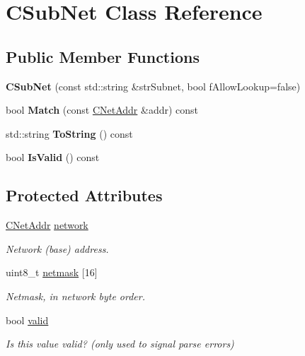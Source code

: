\hypertarget{class_c_sub_net}{}\section{C\+Sub\+Net Class Reference}
\label{class_c_sub_net}
\subsection*{Public Member Functions}
\begin{DoxyCompactItemize}
\item 
\mbox{\label{class_c_sub_net_a6e8cd7a5e46e93d3ad62896dcb5a5a78}} 
{\bfseries C\+Sub\+Net} (const std\+::string \&str\+Subnet, bool f\+Allow\+Lookup=false)
\item 
\mbox{\label{class_c_sub_net_af84fa02ebca222739c55e9d2cd7d38a3}} 
bool {\bfseries Match} (const \mbox{\hyperlink{class_c_net_addr}{C\+Net\+Addr}} \&addr) const
\item 
\mbox{\label{class_c_sub_net_a91cabfec6c5056fe8f8b477334563880}} 
std\+::string {\bfseries To\+String} () const
\item 
\mbox{\label{class_c_sub_net_abe05f70043af710ac075a4dd77757394}} 
bool {\bfseries Is\+Valid} () const
\end{DoxyCompactItemize}
\subsection*{Protected Attributes}
\begin{DoxyCompactItemize}
\item 
\mbox{\label{class_c_sub_net_a17c8e899bfed76a371c833fb4cd679c9}} 
\mbox{\hyperlink{class_c_net_addr}{C\+Net\+Addr}} \mbox{\hyperlink{class_c_sub_net_a17c8e899bfed76a371c833fb4cd679c9}{network}}
\begin{DoxyCompactList}\small\item\em Network (base) address. \end{DoxyCompactList}\item 
\mbox{\label{class_c_sub_net_a7ba6fc57a4ddcddfa3f3355cc3e56adc}} 
uint8\+\_\+t \mbox{\hyperlink{class_c_sub_net_a7ba6fc57a4ddcddfa3f3355cc3e56adc}{netmask}} \mbox{[}16\mbox{]}
\begin{DoxyCompactList}\small\item\em Netmask, in network byte order. \end{DoxyCompactList}\item 
\mbox{\label{class_c_sub_net_a01fbc9843041de802baeaf4d6e4bbcc5}} 
bool \mbox{\hyperlink{class_c_sub_net_a01fbc9843041de802baeaf4d6e4bbcc5}{valid}}
\begin{DoxyCompactList}\small\item\em Is this value valid? (only used to signal parse errors) \end{DoxyCompactList}\end{DoxyCompactItemize}
